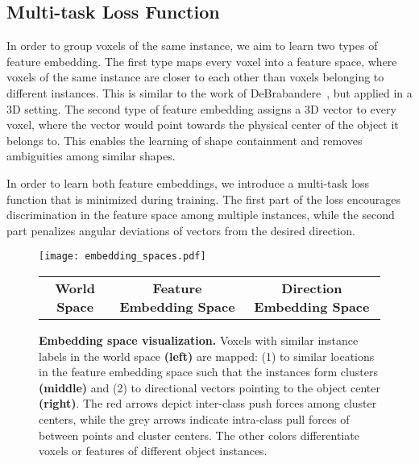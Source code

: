 \documentclass[10pt,twocolumn,letterpaper]{article}
\begin{document}
\subsection{Multi-task Loss Function} \label{subsec:loss}
In order to group voxels of the same instance, we aim to learn two types of feature embedding.
The first type maps every voxel into a feature space, where voxels of the same instance are closer to each other than voxels belonging to different instances.
This is similar to the work of DeBrabandere~\etal\cite{DeBrabandere-et-al-arXiv-2017}, but applied in a 3D setting.
The second type of feature embedding assigns a 3D vector to every voxel, where the vector would point towards the physical center of the object it belongs to.
This enables the learning of shape containment and removes ambiguities among similar shapes.

In order to learn both feature embeddings, we introduce a multi-task loss function that is minimized during training. 
The first part of the loss encourages discrimination in the feature space among multiple instances, while the second part penalizes angular deviations of vectors from the desired direction.




\begin{figure*}[t!]
  \small
\centering  
  \texttt{[image: embedding\_spaces.pdf]} \\[-0.6cm]
\setlength{\tabcolsep}{15mm}
  \begin{tabular}{ccc}	   	   
	   \textbf{World Space} & \hspace{0.5cm}\textbf{Feature Embedding Space} & \hspace{-1.5cm}\textbf{Direction Embedding Space}\\
	\end{tabular}
\caption{\textbf{Embedding space visualization.}
  Voxels with similar instance labels in the world space \textbf{(left)} are mapped: (1) to similar locations in the feature embedding space such that the instances form clusters \textbf{(middle)} and (2) to directional vectors pointing to the object center \textbf{(right)}. The red arrows depict inter-class push forces among cluster centers, while the grey arrows indicate intra-class pull forces of between points and cluster centers.
  The other colors differentiate voxels or features of different object instances.
  }
  \label{fig:embedding_spaces}
\end{figure*}
\end{document}

